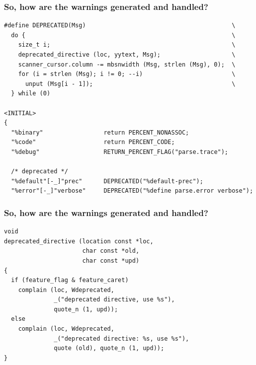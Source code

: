 \documentclass{beamer}
\begin{document}
\begin{frame}[fragile,shrink=25]
  \frametitle{So, how are the warnings generated and handled?}
\begin{verbatim}
#define DEPRECATED(Msg)                                         \
  do {                                                          \
    size_t i;                                                   \
    deprecated_directive (loc, yytext, Msg);                    \
    scanner_cursor.column -= mbsnwidth (Msg, strlen (Msg), 0);  \
    for (i = strlen (Msg); i != 0; --i)                         \
      unput (Msg[i - 1]);                                       \
  } while (0)

<INITIAL>
{
  "%binary"                 return PERCENT_NONASSOC;
  "%code"                   return PERCENT_CODE;
  "%debug"                  RETURN_PERCENT_FLAG("parse.trace");

  /* deprecated */
  "%default"[-_]"prec"      DEPRECATED("%default-prec");
  "%error"[-_]"verbose"     DEPRECATED("%define parse.error verbose");
\end{verbatim}
\end{frame}

\begin{frame}[fragile,shrink=25]
  \frametitle{So, how are the warnings generated and handled?}
\begin{verbatim}
void
deprecated_directive (location const *loc,
                      char const *old,
                      char const *upd)
{
  if (feature_flag & feature_caret)
    complain (loc, Wdeprecated,
              _("deprecated directive, use %s"),
              quote_n (1, upd));
  else
    complain (loc, Wdeprecated,
              _("deprecated directive: %s, use %s"),
              quote (old), quote_n (1, upd));
}
\end{verbatim}
\end{frame}
\end{document}
